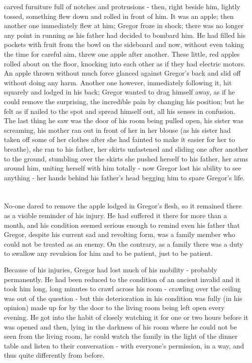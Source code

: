 \documentclass[12pt]{book}
\begin{document}
carved furniture full of notches and protrusions - then, right beside him, lightly tossed, something flew down and rolled in front of him. It was an apple; then another one immediately flew at him; Gregor froze in shock; there was no longer any point in running as his father had decided to bombard him. He had filled his pockets with fruit from the bowl on the sideboard and now, without even taking the time for careful aim, threw one apple after another. These little, red apples rolled about on the floor, knocking into each other as if they had electric motors. An apple thrown without much force glanced against Gregor's back and slid off without doing any harm. Another one however, immediately following it, hit squarely and lodged in his back; Gregor wanted to drag himself away, as if he could remove the surprising, the incredible pain by changing his position; but he felt as if nailed to the spot and spread himself out, all his senses in confusion. The last thing he saw was the door of his room being pulled open, his sister was screaming, his mother ran out in front of her in her blouse (as his sister had taken off some of her clothes after she had fainted to make it easier for her to breathe), she ran to his father, her skirts unfastened and sliding one after another to the ground, stumbling over the skirts she pushed herself to his father, her arms around him, uniting herself with him totally - now Gregor lost his ability to see anything - her hands behind his father's head begging him to spare Gregor's life.

    \chapter{}
    No-one dared to remove the apple lodged in Gregor's flesh, so it remained there as a visible reminder of his injury. He had suffered it there for more than a month, and his condition seemed serious enough to remind even his father that Gregor, despite his current sad and revolting form, was a family member who could not be treated as an enemy. On the contrary, as a family there was a duty to swallow any revulsion for him and to be patient, just to be patient.

    Because of his injuries, Gregor had lost much of his mobility - probably permanently. He had been reduced to the condition of an ancient invalid and it took him long, long minutes to crawl across his room - crawling over the ceiling was out of the question - but this deterioration in his condition was fully (in his opinion) made up for by the door to the living room being left open every evening. He got into the habit of closely watching it for one or two hours before it was opened and then, lying in the darkness of his room where he could not be seen from the living room, he could watch the family in the light of the dinner table and listen to their conversation - with everyone's permission, in a way, and thus quite differently from before.
\end{document}
